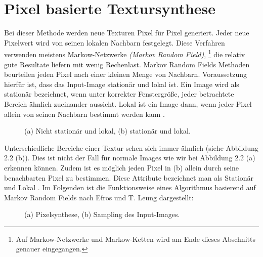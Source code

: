 \documentclass[12pt, a4paper,twoside,openany]{report} %
\begin{document}
\section{Pixel basierte Textursynthese}

Bei dieser Methode werden neue Texturen Pixel für Pixel generiert.
Jeder neue Pixelwert wird von seinen lokalen Nachbarn festgelegt.
Diese Verfahren verwenden meistens Markow-Netzwerke \textit{(Markov Random Field)},
\footnote[1]{Auf Markow-Netzwerke und Markow-Ketten wird am Ende dieses Abschnitts genauer eingegangen.}
die relativ gute Resultate liefern mit wenig Rechenlast.
Markov Random Fields Methoden beurteilen jeden Pixel nach einer kleinen Menge von Nachbarn.
Voraussetzung hierfür ist, dass das Input-Image stationär und lokal ist.
Ein Image wird als stationär bezeichnet, wenn unter korrekter Fenstergröße,
jeder betrachtete Bereich ähnlich zueinander aussieht.
Lokal ist ein Image dann, wenn jeder Pixel allein von seinen Nachbarn bestimmt werden kann \cite{GomathiShah2009}.

\begin{figure}[H]
    \centering
    \qquad
    \caption{(a) Nicht stationär und lokal, (b) stationär und lokal.}%
\end{figure}

Unterschiedliche Bereiche einer Textur sehen sich immer ähnlich {(siehe Abbildung 2.2 (b))}.
Dies ist nicht der Fall für normale Images wie wir bei Abbildung 2.2 {(a)} erkennen können.
Zudem ist es möglich jeden Pixel in {(b)} allein durch seine benachbarten Pixel zu bestimmen.
Diese Attribute bezeichnet man als Stationär und Lokal \cite{GomathiShah2009}.
Im Folgenden ist die Funktionsweise eines Algorithmus basierend auf Markov Random Fields nach Efros und T. Leung dargestellt: \cite{Efros99}

\begin{figure}[H]
    \centering
    \qquad
    \caption{(a) Pixelsynthese, (b) Sampling des Input-Images.}%
\end{figure}
\end{document}
